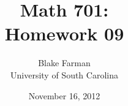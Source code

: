 \documentclass[10pt]{amsart}
\author{Blake Farman\\University of South Carolina}
\title{Math 701:\\Homework 09}
\date{November 16, 2012}
\begin{document}
\maketitle

\newtheorem{thm}{}
\newtheorem{lem}{Lemma}

\end{document}
